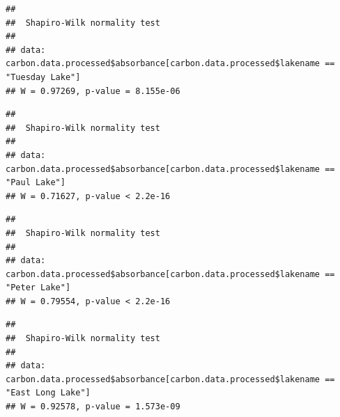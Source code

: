 \documentclass[12pt,]{article}
\newenvironment{Shaded}{\begin{snugshade}}{\end{snugshade}}
\newcommand{\KeywordTok}[1]{\textcolor[rgb]{0.13,0.29,0.53}{\textbf{#1}}}
\newcommand{\StringTok}[1]{\textcolor[rgb]{0.31,0.60,0.02}{#1}}
\newcommand{\OperatorTok}[1]{\textcolor[rgb]{0.81,0.36,0.00}{\textbf{#1}}}
\newcommand{\NormalTok}[1]{#1}
\begin{document}
\begin{verbatim}
## 
##  Shapiro-Wilk normality test
## 
## data:  carbon.data.processed$absorbance[carbon.data.processed$lakename ==     "Tuesday Lake"]
## W = 0.97269, p-value = 8.155e-06
\end{verbatim}

\begin{Shaded}
\end{Shaded}

\begin{verbatim}
## 
##  Shapiro-Wilk normality test
## 
## data:  carbon.data.processed$absorbance[carbon.data.processed$lakename ==     "Paul Lake"]
## W = 0.71627, p-value < 2.2e-16
\end{verbatim}

\begin{Shaded}
\end{Shaded}

\begin{verbatim}
## 
##  Shapiro-Wilk normality test
## 
## data:  carbon.data.processed$absorbance[carbon.data.processed$lakename ==     "Peter Lake"]
## W = 0.79554, p-value < 2.2e-16
\end{verbatim}

\begin{Shaded}
\end{Shaded}

\begin{verbatim}
## 
##  Shapiro-Wilk normality test
## 
## data:  carbon.data.processed$absorbance[carbon.data.processed$lakename ==     "East Long Lake"]
## W = 0.92578, p-value = 1.573e-09
\end{verbatim}
\end{document}
